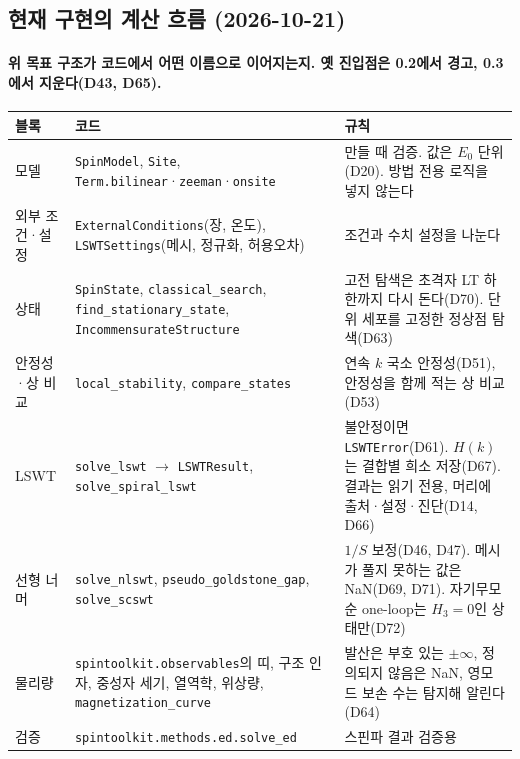 \subsection{현재 구현의 계산 흐름 (2026-10-21)}\label{workflow-implementation}
\begingroup%
  \framesubtitle{위 목표 구조가 코드에서 어떤 이름으로 이어지는지. 옛 진입점은 0.2에서 경고, 0.3에서 지운다(D43, D65).}
  \footnotesize\renewcommand{\arraystretch}{1.08}
  \begin{tabularx}{\textwidth}{@{}p{2.6cm}p{4.6cm}Y@{}}
    \toprule
    블록 & 코드 & 규칙 \\
    \midrule
    모델 & \texttt{SpinModel}, \texttt{Site}, \texttt{Term.bilinear}·\texttt{zeeman}·\texttt{onsite} & 만들 때 검증. 값은 $E_0$ 단위(D20). 방법 전용 로직을 넣지 않는다 \\
    외부 조건·설정 & \texttt{ExternalConditions}(장, 온도), \texttt{LSWTSettings}(메시, 정규화, 허용오차) & 조건과 수치 설정을 나눈다 \\
    상태 & \texttt{SpinState}, \texttt{classical\_search}, \texttt{find\_stationary\_state}, \texttt{IncommensurateStructure} & 고전 탐색은 초격자 LT 하한까지 다시 돈다(D70). 단위 세포를 고정한 정상점 탐색(D63) \\
    안정성·상 비교 & \texttt{local\_stability}, \texttt{compare\_states} & 연속 $k$ 국소 안정성(D51), 안정성을 함께 적는 상 비교(D53) \\
    LSWT & \texttt{solve\_lswt} $\to$ \texttt{LSWTResult}, \texttt{solve\_spiral\_lswt} & 불안정이면 \texttt{LSWTError}(D61). $H(k)$는 결합별 희소 저장(D67). 결과는 읽기 전용, 머리에 출처·설정·진단(D14, D66) \\
    선형 너머 & \texttt{solve\_nlswt}, \texttt{pseudo\_goldstone\_gap}, \texttt{solve\_scswt} & $1/S$ 보정(D46, D47). 메시가 풀지 못하는 값은 NaN(D69, D71). 자기무모순 one-loop는 $H_3=0$인 상태만(D72) \\
    물리량 & \texttt{spintoolkit.observables}의 띠, 구조 인자, 중성자 세기, 열역학, 위상량, \texttt{magnetization\_curve} & 발산은 부호 있는 $\pm\infty$, 정의되지 않음은 NaN, 영모드 보손 수는 탐지해 알린다(D64) \\
    검증 & \texttt{spintoolkit.methods.ed.solve\_ed} & 스핀파 결과 검증용 \\
    \bottomrule
  \end{tabularx}
\endgroup


